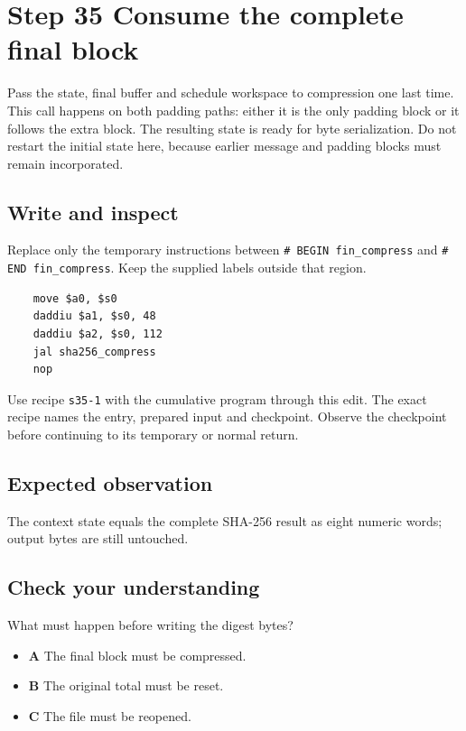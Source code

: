 \section{Step 35 Consume the complete final block}\label{sha-s35}

Pass the state, final buffer and schedule workspace to compression one last time. This call happens on both padding paths: either it is the only padding block or it follows the extra block. The resulting state is ready for byte serialization. Do not restart the initial state here, because earlier message and padding blocks must remain incorporated.

\subsection{Write and inspect}
Replace only the temporary instructions between \texttt{\# BEGIN fin\_compress} and \texttt{\# END fin\_compress}. Keep the supplied labels outside that region.

\begin{verbatim}
    move $a0, $s0
    daddiu $a1, $s0, 48
    daddiu $a2, $s0, 112
    jal sha256_compress
    nop
\end{verbatim}

Use recipe \texttt{s35-1} with the cumulative program through this edit. The exact recipe names the entry, prepared input and checkpoint. Observe the checkpoint before continuing to its temporary or normal return.

\subsection{Expected observation}
The context state equals the complete SHA-256 result as eight numeric words; output bytes are still untouched.

\subsection{Check your understanding}
What must happen before writing the digest bytes?

\begin{itemize}
  \item \textbf{A} The final block must be compressed.
  \item \textbf{B} The original total must be reset.
  \item \textbf{C} The file must be reopened.
\end{itemize}
